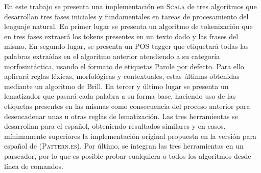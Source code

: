 
En este trabajo se presenta una implementación en \textsc{Scala} de tres algoritmos que desarrollan tres fases iniciales y fundamentales en tareas de procesamiento del lenguaje natural. En primer lugar se presenta un algoritmo de tokenización que en tres fases extraerá los tokens presentes en un texto dado y las frases del mismo. En segundo lugar, se presenta un POS tagger que etiquetará todas las palabras extraídas en el algoritmo anterior atendiendo a su categoría morfosintáctica, usando el formato de etiquetas \textsf{Parole} por defecto. Para ello aplicará reglas léxicas, morfológicas y contextuales, estas últimas obtenidas mediante un algoritmo de Brill. En tercer y último lugar se presenta un lematizador que pasará cada palabra a su forma base, haciendo uso de las etiquetas presentes en las mismas como consecuencia del proceso anterior para desencadenar unas u otras reglas de lematización. 
\newline
Las tres herramientas se desarrollan para el español, obteniendo resultados similares y en casos, mínimamente superiores la implementación original propuesta en la versión para español de \citet{smedt2012pattern} (\textsc{Pattern.es}). Por último, se integran las tres herramientas en un parseador, por lo que es posible probar cualquiera o todos los algoritmos desde línea de comandos. 





